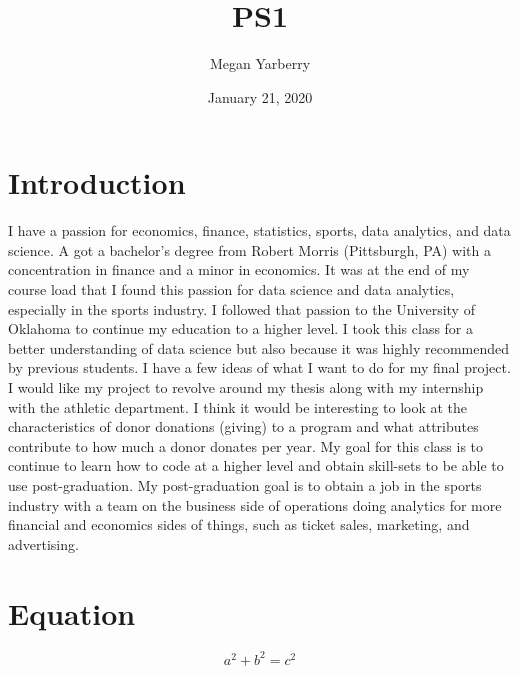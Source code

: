 \documentclass{article}
\title{PS1}
\author{Megan Yarberry }
\date{January 21, 2020}
\begin{document}
\maketitle

\section{Introduction}
I have a passion for economics, finance, statistics, sports, data analytics, and data science.  A got a bachelor's degree from Robert Morris (Pittsburgh, PA) with a concentration in finance and a minor in economics. It was at the end of my course load that I found this passion for data science and data analytics, especially in the sports industry. I followed that passion to the University of Oklahoma to continue my education to a higher level. I took this class for a better understanding of data science but also because it was highly recommended by previous students. I have a few ideas of what I want to do for my final project. I would like my project to revolve around my thesis along with my internship with the athletic department. I think it would be interesting to look at the characteristics of donor donations (giving) to a program and what attributes contribute to how much a donor donates per year. My goal for this class is to continue to learn how to code at a higher level and obtain skill-sets to be able to use post-graduation. My post-graduation goal is to obtain a job in the sports industry with a team on the business side of operations doing analytics for more financial and economics sides of things, such as ticket sales, marketing, and advertising. 


\section{Equation}
\[a^2 + b^2 = c^2\]
\end{document}
